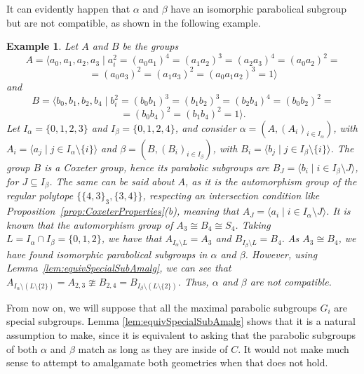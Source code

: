 \documentclass[11pt,letterpaper]{amsart}
\newtheorem{example}[prop]{Example}
\begin{document}
It can evidently happen that $\alpha$ and $\beta$ have an isomorphic parabolical subgroup but are not compatible, as shown in the following example.

\begin{example}
    Let $A$ and $B$ be the groups $$A=\langle a_0,a_1,a_2,a_3\mid a_i^2=(a_0a_1)^4=(a_1a_2)^3=(a_2a_3)^4=(a_0a_2)^2 =$$ 
    $$=(a_0a_3)^2 = (a_1a_3)^2=(a_0a_1a_2)^3=1\rangle$$
    and 
    $$B=\langle b_0,b_1,b_2,b_4\mid b_i^2=(b_0b_1)^3=(b_1b_2)^3=(b_2b_4)^4=(b_0b_2)^2=$$ $$=(b_0b_4)^2=(b_1b_4)^2=1\rangle.$$
   Let $I_\alpha=\{0,1,2,3\}$ and $I_\beta=\{0,1,2,4\}$, and consider $\alpha=(A,(A_i)_{i\in I_\alpha})$, with $A_i=\langle a_j\mid j\in I_{\alpha}\setminus\{i\}\rangle$ and $\beta=(B,(B_i)_{i\in I_\beta})$, with $B_i=\langle b_j\mid j\in I_{\beta}\setminus\{i\}\rangle$.
   The group $B$ is a Coxeter group, hence its parabolic subgroups are $B_J = \langle b_i\mid i\in I_\beta\setminus J\rangle$, for $J\subseteq I_\beta$. The same can be said about $A$, as it is the automorphism group of the regular polytope $\{\{4,3\}_3,\{3,4\}\}$\cite{Hartley2006}, respecting an intersection condition like Proposition~\ref{prop:CoxeterProperties}(b), meaning that $A_J = \langle a_i\mid i\in I_\alpha\setminus J\rangle$.
   It is known that the automorphism group of $A_3\cong B_4 \cong S_4$. Taking $L=I_\alpha\cap I_\beta = \{0,1,2\}$, we have that $A_{I_\alpha\setminus L}= A_3$ and $B_{I_\beta\setminus L}= B_4$. As $A_3\cong B_4$, we have found isomorphic parabolical subgroups in $\alpha$ and $\beta$. However, using Lemma~\ref{lem:equivSpecialSubAmalg}, we can see that $A_{I_\alpha\setminus(L\setminus\{2\})}=A_{2,3}\ncong B_{2,4} = B_{I_\beta\setminus(L\setminus\{2\})}$. Thus, $\alpha$ and $\beta$ are not compatible.
\end{example}

From now on, we will suppose that all the maximal parabolic subgroups $G_i$ are special subgroups. Lemma \ref{lem:equivSpecialSubAmalg} shows that it is a natural assumption to make, since it is equivalent to asking that the parabolic subgroups of both $\alpha$ and $\beta$ match as long as they are inside of $C$. It would not make much sense to attempt to amalgamate both geometries when that does not hold.
\end{document}
